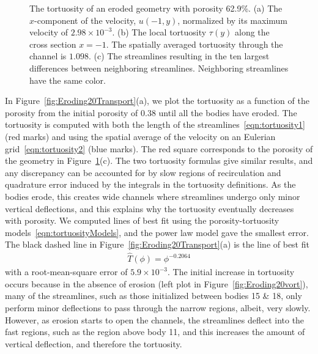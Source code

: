 \documentclass[preprint, 10pt]{elsarticle}
\begin{document}
\begin{figure}[H]
\begin{subfigure}[b]{0.5\textwidth}
\caption{}
\end{subfigure}
\caption{\label{fig:Eroding20tort} The tortuosity of an eroded geometry
with porosity 62.9\%. (a) The $x$-component of the velocity, $u(-1,y)$,
normalized by its maximum velocity of $2.98 \times 10^{-3}$. (b) The
local tortuosity $\tau(y)$ along the cross section $x = -1$.  The
spatially averaged tortuosity through the channel is $1.098$.  (c) The
streamlines resulting in the ten largest differences between neighboring
streamlines.  Neighboring streamlines have the same color.}
\end{figure}

In Figure~\ref{fig:Eroding20Transport}(a), we plot the tortuosity as a
function of the porosity from the initial porosity of $0.38$ until all
the bodies have eroded.  The tortuosity is computed with both the length
of the streamlines~\eqref{eqn:tortuosity1} (red marks) and using the
spatial average of the velocity on an Eulerian
grid~\eqref{eqn:tortuosity2} (blue marks).  The red square corresponds
to the porosity of the geometry in Figure~\ref{fig:Eroding20tort}(c).
The two tortuosity formulas give similar results, and any discrepancy
can be accounted for by slow regions of recirculation and quadrature
error induced by the integrals in the tortuosity definitions.  As the
bodies erode, this creates wide channels where streamlines undergo only
minor vertical deflections, and this explains why the tortuosity
eventually decreases with porosity.  We computed lines of best fit using
the porosity-tortuosity models~\eqref{eqn:tortuosityModels}, and the
power law model gave the smallest error.  The  black dashed line in
Figure~\ref{fig:Eroding20Transport}(a) is the line of best fit
\begin{align}
  \widehat{T}(\phi) = \phi^{-0.2064}
\end{align}
with a root-mean-square error of $5.9 \times 10^{-3}$.  The initial
increase in tortuosity occurs because in the absence of erosion (left
plot in Figure~\ref{fig:Eroding20vort}), many of the streamlines, such
as those initialized between bodies 15 \& 18, only perform minor
deflections to pass through the narrow regions, albeit, very slowly.
However, as erosion starts to open the channels, the streamlines deflect
into the fast regions, such as the region above body 11, and this
increases the amount of vertical deflection, and therefore the
tortuosity.
\end{document}
